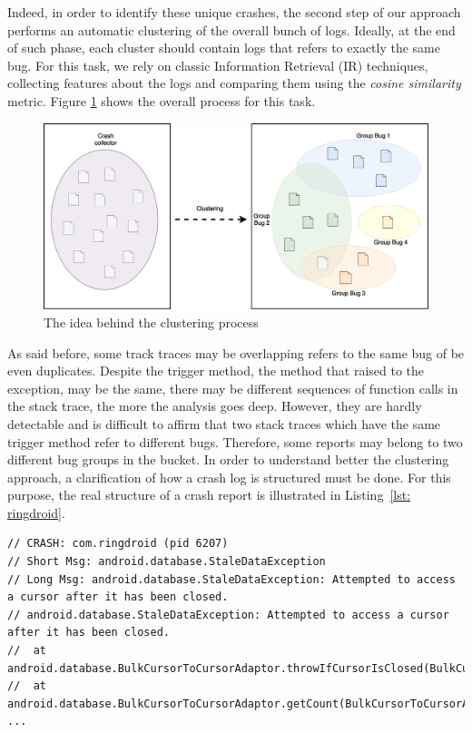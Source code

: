  
Indeed, in order to identify these unique crashes, the second step of our approach performs an automatic clustering of the overall bunch of logs. Ideally, at the end of such phase, each cluster should contain logs that refers to exactly the same bug.
For this task, we rely on classic Information Retrieval (IR) techniques, collecting features about the logs and comparing them using the \textit{cosine similarity} metric.
Figure \ref{fig: clustering} shows the overall process for this task. 
\begin{figure}[tb]
\centering 
\includegraphics[width=\columnwidth]{imgs/clusteringidea} 
\caption{The idea behind the clustering process}
\label{fig: clustering}
\end{figure}
As said before, some track traces may be overlapping \ie refers to the same bug of be even duplicates. 
Despite the trigger method, \ie the method that raised to the exception, may be the same, there may be different sequences of function calls in the stack trace, the more the analysis goes deep. 
However, they are hardly detectable and is difficult to affirm that two stack traces which have the same trigger method refer to different bugs. 
Therefore, some reports may belong to two different bug groups in the bucket. 
In order to understand better the clustering approach, a clarification of how a crash log is structured must be done. 
For this purpose, the real structure of a crash report is illustrated in Listing~\ref{lst: ringdroid}. 
\begin{lstlisting}[caption=Structure of a crash log, basicstyle=\fontsize{6}{8}\ttfamily,label={lst: ringdroid}]
// CRASH: com.ringdroid (pid 6207)
// Short Msg: android.database.StaleDataException
// Long Msg: android.database.StaleDataException: Attempted to access a cursor after it has been closed.
// android.database.StaleDataException: Attempted to access a cursor after it has been closed.
// 	at android.database.BulkCursorToCursorAdaptor.throwIfCursorIsClosed(BulkCursorToCursorAdaptor.java:64)
// 	at android.database.BulkCursorToCursorAdaptor.getCount(BulkCursorToCursorAdaptor.java:70)
...
\end{lstlisting}
